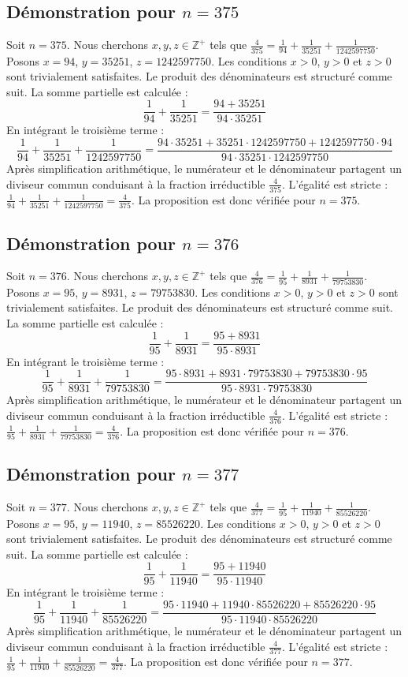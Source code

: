 \documentclass[11pt,a4paper]{article}
\begin{document}
\subsection{Démonstration pour $n = 375$}
Soit $n = 375$. Nous cherchons $x, y, z \in \mathbb{Z}^{+}$ tels que $\frac{4}{375} = \frac{1}{94} + \frac{1}{35251} + \frac{1}{1242597750}$.
Posons $x = 94$, $y = 35251$, $z = 1242597750$.
Les conditions $x > 0$, $y > 0$ et $z > 0$ sont trivialement satisfaites.
Le produit des dénominateurs est structuré comme suit. La somme partielle est calculée :
$$ \frac{1}{94} + \frac{1}{35251} = \frac{94+35251}{94 \cdot 35251} $$
En intégrant le troisième terme :
$$ \frac{1}{94} + \frac{1}{35251} + \frac{1}{1242597750} = \frac{94 \cdot 35251 + 35251 \cdot 1242597750 + 1242597750 \cdot 94}{94 \cdot 35251 \cdot 1242597750} $$
Après simplification arithmétique, le numérateur et le dénominateur partagent un diviseur commun conduisant à la fraction irréductible $\frac{4}{375}$.
L'égalité est stricte : $\frac{1}{94} + \frac{1}{35251} + \frac{1}{1242597750} = \frac{4}{375}$.
La proposition est donc vérifiée pour $n = 375$.
\subsection{Démonstration pour $n = 376$}
Soit $n = 376$. Nous cherchons $x, y, z \in \mathbb{Z}^{+}$ tels que $\frac{4}{376} = \frac{1}{95} + \frac{1}{8931} + \frac{1}{79753830}$.
Posons $x = 95$, $y = 8931$, $z = 79753830$.
Les conditions $x > 0$, $y > 0$ et $z > 0$ sont trivialement satisfaites.
Le produit des dénominateurs est structuré comme suit. La somme partielle est calculée :
$$ \frac{1}{95} + \frac{1}{8931} = \frac{95+8931}{95 \cdot 8931} $$
En intégrant le troisième terme :
$$ \frac{1}{95} + \frac{1}{8931} + \frac{1}{79753830} = \frac{95 \cdot 8931 + 8931 \cdot 79753830 + 79753830 \cdot 95}{95 \cdot 8931 \cdot 79753830} $$
Après simplification arithmétique, le numérateur et le dénominateur partagent un diviseur commun conduisant à la fraction irréductible $\frac{4}{376}$.
L'égalité est stricte : $\frac{1}{95} + \frac{1}{8931} + \frac{1}{79753830} = \frac{4}{376}$.
La proposition est donc vérifiée pour $n = 376$.
\subsection{Démonstration pour $n = 377$}
Soit $n = 377$. Nous cherchons $x, y, z \in \mathbb{Z}^{+}$ tels que $\frac{4}{377} = \frac{1}{95} + \frac{1}{11940} + \frac{1}{85526220}$.
Posons $x = 95$, $y = 11940$, $z = 85526220$.
Les conditions $x > 0$, $y > 0$ et $z > 0$ sont trivialement satisfaites.
Le produit des dénominateurs est structuré comme suit. La somme partielle est calculée :
$$ \frac{1}{95} + \frac{1}{11940} = \frac{95+11940}{95 \cdot 11940} $$
En intégrant le troisième terme :
$$ \frac{1}{95} + \frac{1}{11940} + \frac{1}{85526220} = \frac{95 \cdot 11940 + 11940 \cdot 85526220 + 85526220 \cdot 95}{95 \cdot 11940 \cdot 85526220} $$
Après simplification arithmétique, le numérateur et le dénominateur partagent un diviseur commun conduisant à la fraction irréductible $\frac{4}{377}$.
L'égalité est stricte : $\frac{1}{95} + \frac{1}{11940} + \frac{1}{85526220} = \frac{4}{377}$.
La proposition est donc vérifiée pour $n = 377$.
\end{document}
